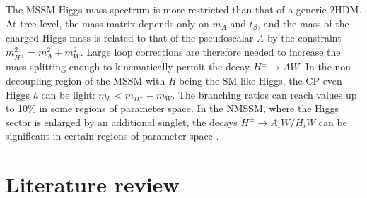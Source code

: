 The MSSM Higgs mass spectrum is more restricted than that of a generic $2$HDM. At tree level, the mass matrix depends only on $m_A$ and $t_{\beta}$, and the mass of the charged Higgs mass is related to that of the pseudoscalar \emph{A} by the constraint $m_{H^{\pm}}^2 =m_A^2 + m_W^2$. Large loop corrections are therefore needed to increase the mass splitting enough to kinematically permit the decay $H^{\pm} \rightarrow AW$. In the non-decoupling region of the MSSM with \emph{H} being the SM-like Higgs, the CP-even Higgs \emph{h} can be light: $m_{h}<m_{H^{\pm}}-m_W$. The branching ratios can reach values up to 10\% \cite{Heinemeyer:2013tqa} in some regions of parameter space. In the NMSSM, where the Higgs sector is enlarged by an additional singlet, the decays $H^{\pm} \rightarrow A_iW/H_iW$ can be significant in certain regions of parameter space \cite{Christensen:2013dra,Drees:1999sb}.

\section{Literature review}\label{sec:limits}

